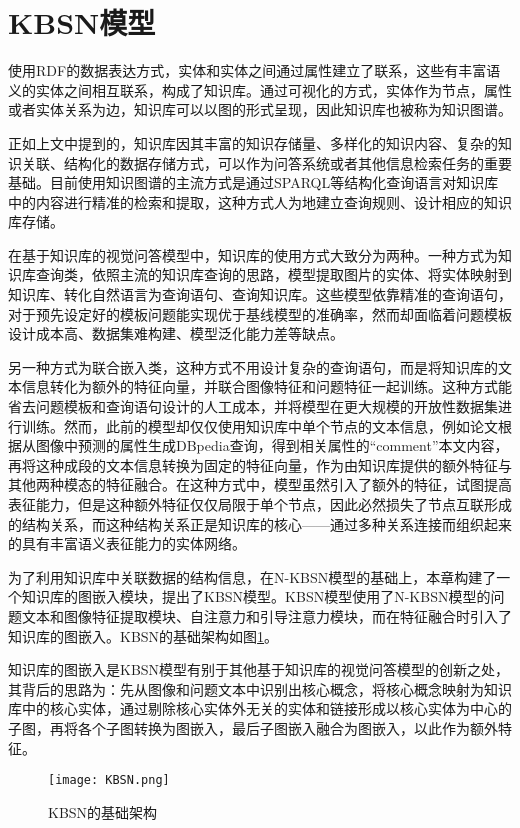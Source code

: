 \section{KBSN模型}
使用RDF的数据表达方式，实体和实体之间通过属性建立了联系，这些有丰富语义的实体之间相互联系，构成了知识库。通过可视化的方式，实体作为节点，属性或者实体关系为边，知识库可以以图的形式呈现，因此知识库也被称为知识图谱。

正如上文中提到的，知识库因其丰富的知识存储量、多样化的知识内容、复杂的知识关联、结构化的数据存储方式，可以作为问答系统或者其他信息检索任务的重要基础。目前使用知识图谱的主流方式是通过SPARQL等结构化查询语言对知识库中的内容进行精准的检索和提取，这种方式人为地建立查询规则、设计相应的知识库存储。

在基于知识库的视觉问答模型中，知识库的使用方式大致分为两种。一种方式为知识库查询类，依照主流的知识库查询的思路，模型提取图片的实体、将实体映射到知识库、转化自然语言为查询语句、查询知识库。这些模型依靠精准的查询语句，对于预先设定好的模板问题能实现优于基线模型的准确率，然而却面临着问题模板设计成本高、数据集难构建、模型泛化能力差等缺点。

另一种方式为联合嵌入类，这种方式不用设计复杂的查询语句，而是将知识库的文本信息转化为额外的特征向量，并联合图像特征和问题特征一起训练。这种方式能省去问题模板和查询语句设计的人工成本，并将模型在更大规模的开放性数据集进行训练。然而，此前的模型却仅仅使用知识库中单个节点的文本信息，例如论文根据从图像中预测的属性生成DBpedia查询，得到相关属性的“comment”本文内容，再将这种成段的文本信息转换为固定的特征向量，作为由知识库提供的额外特征与其他两种模态的特征融合。在这种方式中，模型虽然引入了额外的特征，试图提高表征能力，但是这种额外特征仅仅局限于单个节点，因此必然损失了节点互联形成的结构关系，而这种结构关系正是知识库的核心——通过多种关系连接而组织起来的具有丰富语义表征能力的实体网络。

为了利用知识库中关联数据的结构信息，在N-KBSN模型的基础上，本章构建了一个知识库的图嵌入模块，提出了KBSN模型。KBSN模型使用了N-KBSN模型的问题文本和图像特征提取模块、自注意力和引导注意力模块，而在特征融合时引入了知识库的图嵌入。KBSN的基础架构如图\ref{KBSN}。

知识库的图嵌入是KBSN模型有别于其他基于知识库的视觉问答模型的创新之处，其背后的思路为：先从图像和问题文本中识别出核心概念，将核心概念映射为知识库中的核心实体，通过剔除核心实体外无关的实体和链接形成以核心实体为中心的子图，再将各个子图转换为图嵌入，最后子图嵌入融合为图嵌入，以此作为额外特征。
\begin{figure}[H]
	\centering
	\texttt{[image: KBSN.png]}
	\caption{KBSN的基础架构}
	\label{KBSN}
\end{figure}

